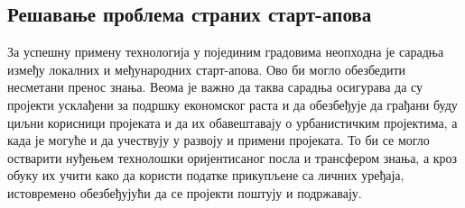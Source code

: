 \documentclass{article}
\begin{document}
\subsection{Решавање проблема страних старт-апова}
За успешну примену технологија у појединим градовима неопходна је сарадња између локалних и међународних старт-апова. Ово би могло обезбедити несметани пренос знања. Веома је важно да таква сарадња осигурава да су пројекти усклађени за подршку економског раста и да обезбеђује да грађани буду циљни корисници пројеката и да их обавештавају о урбанистичким пројектима, а када је могуће и да учествују у развоју и примени пројеката. То би се могло остварити нуђењем технолошки оријентисаног посла и трансфером знања, а кроз обуку их учити како да користи податке прикупљене са личних уређаја, истовремено обезбеђујући да се пројекти поштују и подржавају.
\end{document}
